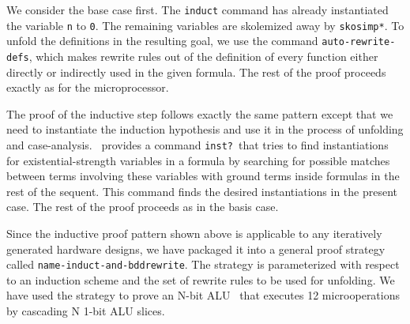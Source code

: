 %

We consider the base case first.
The {\tt induct} command has already instantiated the variable {\tt n}
to {\tt 0}.
The remaining variables are skolemized away by {\tt skosimp*}.
To unfold the definitions in the resulting goal, we use
the command {\tt auto-rewrite-defs}, which makes rewrite rules out
of the definition of every function either directly or indirectly
used in the given formula.
The rest of the proof proceeds exactly as for the microprocessor.

The proof of the inductive step follows exactly the same pattern except
that we need to instantiate the induction hypothesis and use it in
the process of unfolding and case-analysis.
\pvs\ provides a command {\tt inst?}\ that tries to find instantiations
for existential-strength variables in a formula by searching for possible
matches between terms involving these variables with ground terms inside
formulas in the rest of the sequent.  This command finds the desired
instantiations in the present case.  The rest of the proof proceeds
as in the basis case.

Since the inductive proof pattern shown above is applicable to any
iteratively generated hardware designs, we have packaged it into a
general proof strategy called {\tt name-induct-and-bddrewrite}.  The
strategy is parameterized with respect to an induction scheme
and the set of rewrite rules to be used for unfolding.  We have used
the strategy to prove an N-bit ALU~\cite{cantu:alu} that executes 12
microoperations by cascading N 1-bit ALU slices.

